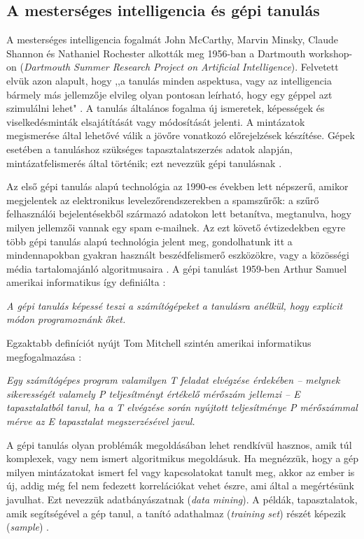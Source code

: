 \documentclass[12pt,a4paper]{article}
\begin{document}
\subsection{A mesterséges intelligencia és gépi tanulás}

A mesterséges intelligencia fogalmát John McCarthy, Marvin Minsky, Claude Shannon és Nathaniel Rochester alkották meg 1956-ban a Dartmouth workshop-on (\textit{Dartmouth Summer Research Project on Artificial Intelligence}). Felvetett elvük azon alapult, hogy ,,a tanulás minden aspektusa, vagy az intelligencia bármely más jellemzője elvileg olyan pontosan leírható, hogy egy géppel azt szimulálni lehet" \cite{moor_dartmouth_2006,choi_introduction_2020}. A tanulás általános fogalma új ismeretek, képességek és viselkedésminták elsajátítását vagy módosítását jelenti. A mintázatok megismerése által lehetővé válik a jövőre vonatkozó előrejelzések készítése. Gépek esetében a tanuláshoz szükséges tapasztalatszerzés adatok alapján, mintázatfelismerés által történik; ezt nevezzük gépi tanulásnak \cite{alzubi_machine_2018}. 

Az első gépi tanulás alapú technológia az 1990-es években lett népszerű, amikor megjelentek az elektronikus levelezőrendszerekben a spamszűrők: a szűrő felhasználói bejelentésekből származó adatokon lett betanítva, megtanulva, hogy milyen jellemzői vannak egy spam e-mailnek. Az ezt követő évtizedekben egyre több gépi tanulás alapú technológia jelent meg, gondolhatunk itt a mindennapokban gyakran használt beszédfelismerő eszközökre, vagy a közösségi média tartalomajánló algoritmusaira \cite{geron_hands-machine_2017}. A gépi tanulást 1959-ben Arthur Samuel amerikai informatikus így definiálta \cite{lee_machine_2017}: 
\begin{displayquote}
    \textit{A gépi tanulás képessé teszi a számítógépeket a tanulásra anélkül, hogy explicit módon programoznánk őket.} 
\end{displayquote}
Egzaktabb definíciót nyújt Tom Mitchell szintén amerikai informatikus megfogalmazása \cite{mitchell_discipline_2006}: 
\begin{displayquote}
\textit{Egy számítógépes program valamilyen T feladat elvégzése érdekében -- melynek sikerességét valamely P teljesítményt értékelő mérőszám jellemzi -- E tapasztalatból tanul, ha a T elvégzése során nyújtott teljesítménye P mérőszámmal mérve az E tapasztalat megszerzésével javul.} 
\end{displayquote}
A gépi tanulás olyan problémák megoldásában lehet rendkívül hasznos, amik túl komplexek, vagy nem ismert algoritmikus megoldásuk. Ha megnézzük, hogy a gép milyen mintázatokat ismert fel vagy kapcsolatokat tanult meg, akkor az ember is új, addig még fel nem fedezett korrelációkat vehet észre, ami által a megértésünk javulhat. Ezt nevezzük adatbányászatnak (\textit{data mining}). A példák, tapasztalatok, amik segítségével a gép tanul, a tanító adathalmaz (\textit{training set}) részét képezik (\textit{sample}) \cite{geron_hands-machine_2017}. 
\end{document}
